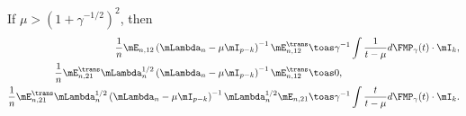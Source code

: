 \begin{lemma}
    If $\mu > \left(1 + \gamma^{-1/2} \right)^2$, then
    \begin{align*}
        \frac{1}{n}
        \mE_{n,12}
        \left(
            \mLambda_n
            -
            \mu \mI_{p-k}
        \right)^{-1}
        \mE_{n,12}^\trans
            &\toas
                \gamma^{-1}
                \int
                    \frac{1}{t - \mu} d\FMP_\gamma(t)
                \cdot
                \mI_k, \\
        \frac{1}{n}
        \mE_{n,21}^\trans
        \mLambda_n^{1/2}
        \left(
            \mLambda_n
            -
            \mu \mI_{p-k}
        \right)^{-1}
        \mE_{n,12}^\trans
            &\toas
                0, \\
        \frac{1}{n}
        \mE_{n,21}^\trans
        \mLambda_n^{1/2}
        \left(
            \mLambda_n
            -
            \mu \mI_{p-k}
        \right)^{-1}
        \mLambda_n^{1/2}
        \mE_{n,21}
            &\toas
                \gamma^{-1}
                \int
                    \frac{t}{t - \mu} d\FMP_\gamma(t)
                \cdot
                \mI_k.
    \end{align*}
\end{lemma}
